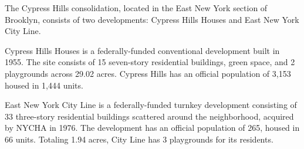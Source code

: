  

The Cypress Hills consolidation, located in the East New York section of Brooklyn, consists of two developments: Cypress Hills Houses and East New York City Line. 

Cypress Hills Houses is a federally-funded conventional development built in 1955. The site consists of 15 seven-story residential buildings, green space, and 2 playgrounds across 29.02 acres. Cypress Hills has an official population of 3,153 housed in 1,444 units. 

East New York City Line is a federally-funded turnkey development consisting of 33 three-story residential buildings scattered around the neighborhood, acquired by NYCHA in 1976. The development has an official population of 265, housed in 66 units. Totaling 1.94 acres, City Line has 3 playgrounds for its residents. 